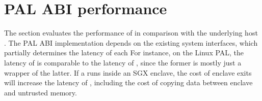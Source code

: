 \section{PAL ABI performance}





The section evaluates the performance of \thehostabi{} in comparison with
the underlying host \linuxapis{}.
The PAL ABI implementation depends on the existing system interfaces,
which partially determines the latency of each \hostapi{} 
For instance, on the Linux PAL, the latency of  is comparable to the latency of ,
since the former is mostly just
a wrapper of the latter.
If a \picoproc{} runs inside an SGX enclave,
the cost of enclave exits will increase
the latency of \hostapis{},
including the cost of copying data between enclave and untrusted memory.


